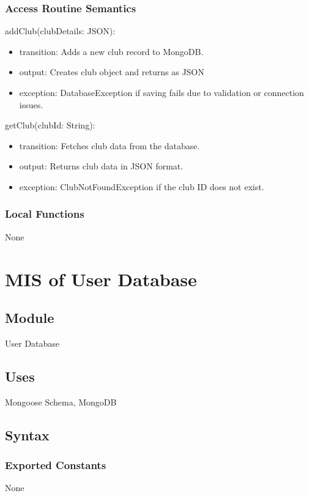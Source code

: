 \documentclass[12pt, titlepage]{article}
\begin{document}
\subsubsection{Access Routine Semantics}

\noindent addClub(clubDetails: JSON):
\begin{itemize}
  \item transition: Adds a new club record to MongoDB.
  \item output: Creates club object and returns as JSON
  \item exception: DatabaseException if saving fails due to validation or connection issues.
\end{itemize}

\noindent getClub(clubId: String):
\begin{itemize}
  \item transition: Fetches club data from the database.
  \item output: Returns club data in JSON format.
  \item exception: ClubNotFoundException if the club ID does not exist.
\end{itemize}

\subsubsection{Local Functions}
None

\section{MIS of User Database} \label{User Database}

\subsection{Module}
User Database

\subsection{Uses}
Mongoose Schema, MongoDB

\subsection{Syntax}

\subsubsection{Exported Constants}
None
\end{document}
